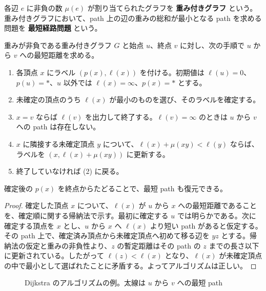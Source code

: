 \documentclass[article,paper=a4paper]{jlreq}
\begin{document}
\begin{dfn}
  各辺 $e$ に非負の数 $\mu(e)$ が割り当てられたグラフを \textbf{重み付きグラフ} という。重み付きグラフにおいて、path 上の辺の重みの総和が最小となる path を求める問題を \textbf{最短経路問題} という。
\end{dfn}

\begin{prop}
  重みが非負である重み付きグラフ $G$ と始点 $u$、終点 $v$ に対し、次の手順で $u$ から $v$ への最短距離を求める。
  \begin{enumerate}[label=(\arabic*)\, ]
    \item 各頂点 $x$ にラベル $(p(x),\ell(x))$ を付ける。初期値は $\ell(u)=0$、$p(u)=*$、$u$ 以外では $\ell(x)=\infty$、$p(x)=*$ とする。
    \item 未確定の頂点のうち $\ell(x)$ が最小のものを選び、そのラベルを確定する。
    \item $x=v$ ならば $\ell(v)$ を出力して終了する。$\ell(v)=\infty$ のときは $u$ から $v$ への path は存在しない。
    \item $x$ に隣接する未確定頂点 $y$ について、$\ell(x)+\mu(xy)<\ell(y)$ ならば、ラベルを $(x,\ell(x)+\mu(xy))$ に更新する。
    \item 終了していなければ (2) に戻る。
  \end{enumerate}
  確定後の $p(x)$ を終点からたどることで、最短 path も復元できる。
\end{prop}

\begin{proof}
  確定した頂点 $x$ について、$\ell(x)$ が $u$ から $x$ への最短距離であることを、確定順に関する帰納法で示す。最初に確定する $u$ では明らかである。次に確定する頂点を $x$ とし、$u$ から $x$ へ $\ell(x)$ より短い path があると仮定する。その path 上で、確定済み頂点から未確定頂点へ初めて移る辺を $yz$ とする。帰納法の仮定と重みの非負性より、$z$ の暫定距離はその path の $z$ までの長さ以下に更新されている。したがって $\ell(z)<\ell(x)$ となり、$\ell(x)$ が未確定頂点の中で最小として選ばれたことに矛盾する。よってアルゴリズムは正しい。
\end{proof}

\begin{figure}[htbp]
  \centering
  \caption{Dijkstra のアルゴリズムの例。太線は $u$ から $v$ への最短 path}
\end{figure}
\end{document}
